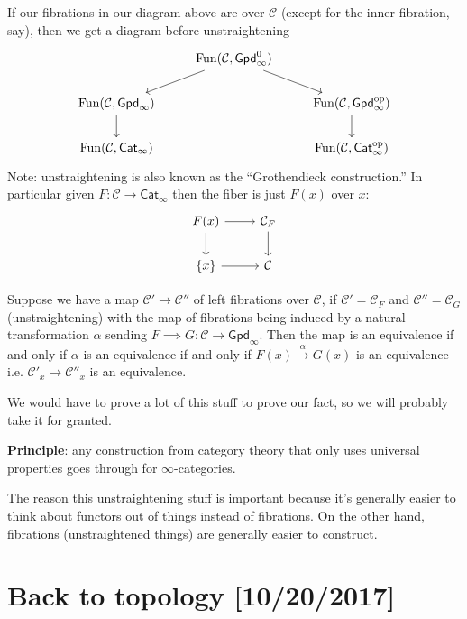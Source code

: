 \documentclass{amsart}
\DeclareMathOperator{\Fun}{Fun}
\begin{document}
If our fibrations in our diagram above are over $\mathcal{C}$ (except for the inner fibration, say),
then we get a diagram before unstraightening
\begin{equation*}
    \begin{tikzcd}
        & \Fun(\mathcal{C}, \mathsf{Gpd}_\infty^0)\ar[ld]\ar[rd] &\\
        \Fun(\mathcal{C}, \mathsf{Gpd}_\infty)\dar  & & \Fun(\mathcal{C},\mathsf{Gpd}_\infty^\text{op})\dar \\
        \Fun(\mathcal{C},\mathsf{Cat}_\infty) & & \Fun(\mathcal{C}, \mathsf{Cat}_\infty^\text{op})
    \end{tikzcd}
\end{equation*}
Note: unstraightening is also known as the ``Grothendieck construction.''
In particular given $F:\mathcal{C}\to \mathsf{Cat}_\infty$ then the fiber is just $F(x)$ over $x$:
\begin{equation*}
    \begin{tikzcd}
        F(x) \rar\dar & \mathcal{C}_F\dar \\
        \{x\} \rar & \mathcal{C}
    \end{tikzcd}
\end{equation*}
\begin{corollary}
    Suppose we have a map $\mathcal{C}'\to \mathcal{C}''$ of left fibrations over $\mathcal{C}$, if 
    $\mathcal{C}'=\mathcal{C}_F$ and $\mathcal{C}''=\mathcal{C}_G$ (unstraightening) with
    the map of fibrations being induced by a natural transformation $\alpha$ sending $F\implies G:\mathcal{C}\to \mathsf{Gpd}_\infty$.
    Then the map is an equivalence if and only if $\alpha$ is an equivalence if and only if
    $F(x)\xrightarrow{\alpha}G(x)$ is an equivalence i.e. $\mathcal{C}'_x\to \mathcal{C}''_x$
    is an equivalence.
\end{corollary}
We would have to prove a lot of this stuff to prove our fact, so we will probably take
it for granted.

\textbf{Principle}: any construction from category theory that only uses universal properties
goes through for $\infty$-categories. 

The reason this unstraightening stuff is important because it's generally easier to
think about functors out of things instead of fibrations. On the other hand,
fibrations (unstraightened things) are generally easier to construct.

\newpage

\section{Back to topology [10/20/2017]}
\end{document}
